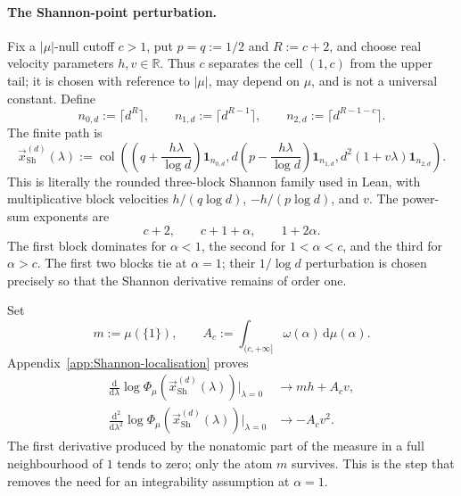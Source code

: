 \documentclass[aps,pra,11pt,onecolumn,nofootinbib,tightenlines]{revtex4-2}
\theoremstyle{definition}
\begin{document}
\paragraph{The Shannon-point perturbation.}
Fix a $|\mu|$-null cutoff $c>1$, put $p=q:=1/2$ and $R:=c+2$, and choose
real velocity parameters $h,v\in\mathbb R$.  Thus $c$ separates the cell
$(1,c)$ from the upper tail; it is chosen with reference to $|\mu|$, may depend
on $\mu$, and is not a universal constant.  Define
\begin{equation}
 n_{0,d}:=\lceil d^R\rceil,
 \qquad
 n_{1,d}:=\lceil d^{R-1}\rceil,
 \qquad
 n_{2,d}:=\lceil d^{R-1-c}\rceil.
 \label{eq:Shannon-counts-main}
\end{equation}
The finite path is
\begin{equation}
 \vec x_{\mathrm{Sh}}^{(d)}(\lambda)
 :=\operatorname{col}\!\left(
 \left(q+\frac{h\lambda}{\log d}\right)\mathbf1_{n_{0,d}},
 d\left(p-\frac{h\lambda}{\log d}\right)\mathbf1_{n_{1,d}},
 d^2(1+v\lambda)\mathbf1_{n_{2,d}}
 \right).
 \label{eq:Shannon-path-main}
\end{equation}
This is literally the rounded three-block Shannon family used in Lean, with
multiplicative block velocities $h/(q\log d)$, $-h/(p\log d)$, and $v$.
The power-sum exponents are
\begin{equation}
 c+2,
 \qquad
 c+1+\alpha,
 \qquad
 1+2\alpha.
 \label{eq:Shannon-exponents-main}
\end{equation}
The first block dominates for $\alpha<1$, the second for $1<\alpha<c$, and the third for $\alpha>c$. The first two blocks tie at $\alpha=1$; their $1/\log d$ perturbation is chosen precisely so that the Shannon derivative remains of order one.

Set
\begin{equation}
 m:=\mu(\{1\}),
 \qquad
 A_c:=\int_{(c,+\infty]}\omega(\alpha)\,\mathrm d\mu(\alpha).
 \label{eq:Shannon-m-A}
\end{equation}
Appendix~\ref{app:Shannon-localisation} proves
\begin{align}
 \frac{\mathrm d}{\mathrm d\lambda}
 \log\Phi_\mu(\vec x_{\mathrm{Sh}}^{(d)}(\lambda))\bigg|_{\lambda=0}
 &\longrightarrow mh+A_cv,
 \label{eq:Shannon-log-first-main}\\
 \frac{\mathrm d^2}{\mathrm d\lambda^2}
 \log\Phi_\mu(\vec x_{\mathrm{Sh}}^{(d)}(\lambda))\bigg|_{\lambda=0}
 &\longrightarrow-A_cv^2.
 \label{eq:Shannon-log-second-main}
\end{align}
The first derivative produced by the nonatomic part of the measure in a full neighbourhood of $1$ tends to zero; only the atom $m$ survives. This is the step that removes the need for an integrability assumption at $\alpha=1$.
\end{document}
